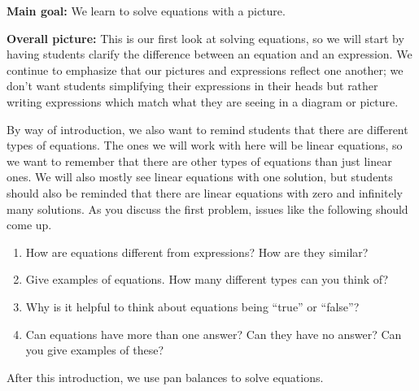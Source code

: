 \documentclass[nooutcomes,noauthor,handout]{ximera}
\begin{document}
\begin{instructorNotes} 



{\bf Main goal:} We learn to solve equations with a picture.


{\bf Overall picture:} This is our first look at solving equations, so we will start by having students clarify the difference between an equation and an expression. We continue to emphasize that our pictures and expressions reflect one another; we don't want students simplifying their expressions in their heads but rather writing expressions which match what they are seeing in a diagram or picture.

By way of introduction, we also want to remind students that there are different types of equations. The ones we will work with here will be linear equations, so we want to remember that there are other types of equations than just linear ones. We will also mostly see linear equations with one solution, but students should also be reminded that there are linear equations with zero and infinitely many solutions. As you discuss the first problem, issues like the following should come up.
\begin{enumerate}
\item How are equations different from expressions? How are they similar?
\item Give examples of equations. How many different types can you think of?
\item Why is it helpful to think about equations being ``true'' or ``false''?
\item Can equations have more than one answer? Can they have no answer? Can you give examples of these?
\end{enumerate}	

After this introduction, we use pan balances to solve equations.



\end{instructorNotes}
\end{document}
